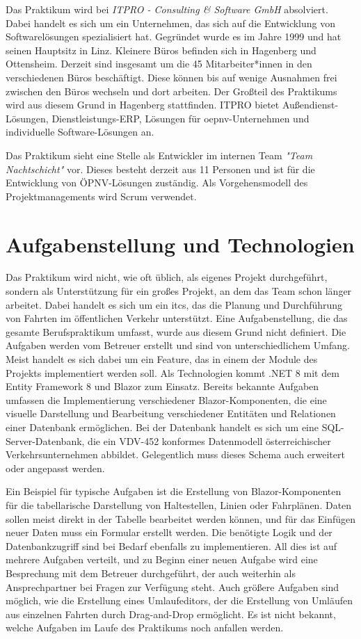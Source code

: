 Das Praktikum wird bei \emph{ITPRO - Consulting \& Software GmbH} absolviert. Dabei handelt es sich um ein Unternehmen, das sich auf die Entwicklung von Softwarelösungen 
spezialisiert hat. Gegründet wurde es im Jahre 1999 und hat seinen Hauptsitz in Linz. Kleinere Büros befinden sich in Hagenberg und Ottensheim. Derzeit sind insgesamt um die 
45 Mitarbeiter*innen in den verschiedenen Büros beschäftigt. Diese können bis auf wenige Ausnahmen frei zwischen den Büros wechseln und dort arbeiten. Der Großteil des Praktikums wird aus diesem Grund 
in Hagenberg stattfinden.
ITPRO bietet Außendienst-Lösungen, Dienstleistungs-ERP, Lösungen für \gls{oepnv}-Unternehmen und individuelle Software-Lösungen an.

Das Praktikum sieht eine Stelle als Entwickler im internen Team \emph{"Team Nachtschicht"} vor. Dieses besteht derzeit aus 11 Personen und ist für die Entwicklung 
von ÖPNV-Lösungen zuständig. Als Vorgehensmodell des Projektmanagements wird Scrum verwendet.

\section{Aufgabenstellung und Technologien} \label{sec:aufgabenstellung}

Das Praktikum wird nicht, wie oft üblich, als eigenes Projekt durchgeführt, sondern als Unterstützung für ein großes Projekt, an dem das Team schon länger arbeitet. Dabei handelt 
es sich um ein \gls{itcs}, das die Planung und Durchführung von Fahrten im öffentlichen Verkehr unterstützt.
Eine Aufgabenstellung, die das gesamte Berufspraktikum umfasst, wurde aus diesem Grund nicht definiert. Die Aufgaben werden vom Betreuer erstellt und sind von unterschiedlichem Umfang.
Meist handelt es sich dabei um ein Feature, das in einem der Module des Projekts implementiert werden soll.
Als Technologien kommt .NET 8 mit dem Entity Framework 8 und Blazor zum Einsatz. Bereits bekannte Aufgaben umfassen die Implementierung verschiedener Blazor-Komponenten,
die eine visuelle Darstellung und Bearbeitung verschiedener Entitäten und Relationen einer Datenbank ermöglichen. Bei der Datenbank handelt es sich um eine SQL-Server-Datenbank,
die ein VDV-452 \cite{VDV452} konformes Datenmodell österreichischer Verkehrsunternehmen abbildet. 
Gelegentlich muss dieses Schema auch erweitert oder angepasst werden. 

Ein Beispiel für typische Aufgaben ist die Erstellung von Blazor-Komponenten für die tabellarische Darstellung von Haltestellen, Linien oder Fahrplänen. Daten sollen 
meist direkt in der Tabelle bearbeitet werden können, und für das Einfügen neuer Daten muss ein Formular erstellt werden. Die benötigte Logik und der Datenbankzugriff
sind bei Bedarf ebenfalls zu implementieren. All dies ist auf mehrere Aufgaben verteilt, und zu Beginn einer neuen Aufgabe wird eine Besprechung mit dem Betreuer durchgeführt,
der auch weiterhin als Ansprechpartner bei Fragen zur Verfügung steht. 
Auch größere Aufgaben sind möglich, wie die Erstellung eines Umlaufeditors, der die Erstellung von Umläufen aus einzelnen Fahrten durch Drag-and-Drop ermöglicht.
Es ist nicht bekannt, welche Aufgaben im Laufe des Praktikums noch anfallen werden.

